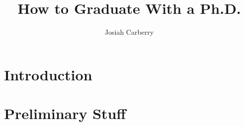\documentclass[12pt]{report}   %
\title{
How to Graduate With a Ph.D.
}
\author{Josiah Carberry}
\begin{document}
\doublespacing
\begin{preliminaries}
\maketitle

\copyrightpage

\begin{signature}
  \setcounter{page}{3} %
\end{signature}

\begin{vita}
  
\end{vita}

\begin{acknowledgments}
  
\end{acknowledgments}

\begin{abstract}
  
  \addtocounter{page}{-1}  %
\end{abstract}

\begin{spacing}{1}
  \tableofcontents
  \clearpage{\pagestyle{empty}\cleardoublepage}

  \footnotesize
  \fontsize{11.5pt}{12.5pt}\selectfont
  \listoftables
  \clearpage{\pagestyle{empty}\cleardoublepage}

  \listoffigures
  \clearpage{\pagestyle{empty}\cleardoublepage}
  \normalsize
\end{spacing}

\end{preliminaries}

\pagestyle{myheadings}


\chapter{Introduction}

\clearpage{\pagestyle{empty}\cleardoublepage}

\chapter{Preliminary Stuff}

\clearpage{\pagestyle{empty}\cleardoublepage}
\end{document}
